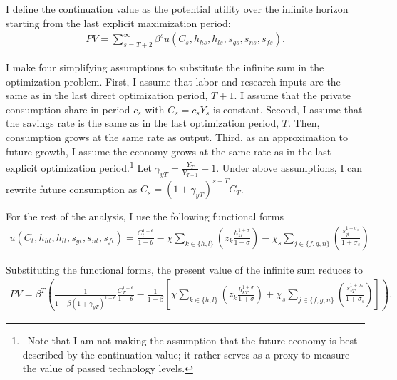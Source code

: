 I define the continuation value as the potential utility over the infinite horizon starting from the last explicit maximization period: 
\begin{align}
PV=\sum_{s=T+2}^{\infty} \beta^{s}u(C_s,h_{hs}, h_{ls}, s_{gs}, s_{ns}, s_{fs}).
\end{align}

I make four simplifying assumptions to substitute the infinite sum in the optimization problem. First, I assume that labor and research inputs are the same as in the last direct optimization period, $T+1$.
 I assume that the private consumption share in period $c_s$ with $C_s=c_sY_s$ is constant.  Second, I assume that the savings rate is the same as in the last optimization period, $T$. Then, consumption grows at the same rate as output. 
Third, as an approximation to future growth, I assume the economy grows at the same rate as in the last explicit optimization period.\footnote{\ Note that I am not making the assumption that the future economy is best described by the continuation value; it rather serves as a proxy to measure the value of passed technology levels. } 
Let $\gamma_{yT}=\frac{Y_{T}}{Y_{T-1}}-1$. Under above assumptions, I can rewrite future consumption as $C_s=(1+\gamma_{yT})^{s-T}C_T$.

For the rest of the analysis, I use the following functional forms
\begin{align}
u(C_t,h_{ht}, h_{lt}, s_{gt}, s_{nt}, s_{ft})= \frac{C_t^{1-\theta}}{1-\theta}-\chi\sum_{k\in\{h,l\}}\left( z_k \frac{h_{kt}^{1+\sigma}}{1+\sigma}\right)-\chi_s\sum_{j\in\{f,g,n\}} \left(\frac{s_{jt}^{1+\sigma_s}}{1+\sigma_s}\right)
\end{align}

Substituting the functional forms, the present value of the infinite sum reduces to
\begin{align}
PV= \beta^T\left(\frac{1}{1-\beta (1+\gamma_{yT})^{1-\theta}}\frac{C_T^{1-\theta}}{1-\theta}-\frac{1}{1-\beta}\left[\chi\sum_{k\in\{h,l\}}\left( z_k \frac{h_{kT}^{1+\sigma}}{1+\sigma}\right)+\chi_s\sum_{j\in\{f,g,n\}} \left(\frac{s_{jT}^{1+\sigma_s}}{1+\sigma_s}\right)\right]\right).
\end{align}
